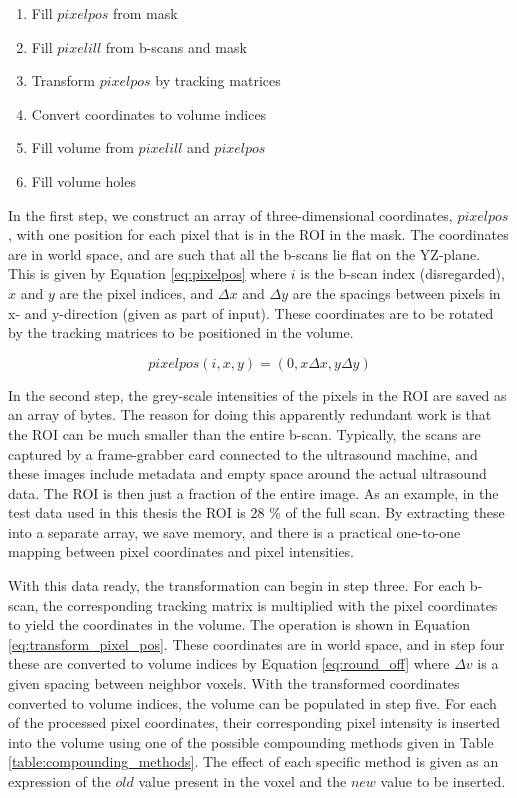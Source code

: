 	\begin{enumerate}
		\item Fill $pixelpos$ from mask
		\item Fill $pixelill$ from b-scans and mask
		\item Transform $pixelpos$ by tracking matrices
		\item Convert coordinates to volume indices
		\item Fill volume from $pixelill$ and $pixelpos$
		\item Fill volume holes
	\end{enumerate}
	
	In the first step, we construct an array of three-dimensional coordinates, $pixelpos$, with one position for each pixel that is in the ROI in the mask. The coordinates are in world space, and are such that all the b-scans lie flat on the YZ-plane. This is given by Equation \ref{eq:pixelpos} where $i$ is the b-scan index (disregarded), $x$ and $y$ are the pixel indices, and $\Delta x$ and $\Delta y$ are the spacings between pixels in x- and y-direction (given as part of input). These coordinates are to be rotated by the tracking matrices to be positioned in the volume.
	
	\begin{equation}
	\label{eq:pixelpos}
		pixelpos(i,x,y) = (0, x\Delta x, y\Delta y)
	\end{equation}
	
	In the second step, the grey-scale intensities of the pixels in the ROI are saved as an array of bytes. The reason for doing this apparently redundant work is that the ROI can be much smaller than the entire b-scan. Typically, the scans are captured by a frame-grabber card connected to the ultrasound machine, and these images include metadata and empty space around the actual ultrasound data. The ROI is then just a fraction of the entire image. As an example, in the test data used in this thesis the ROI is 28 \% of the full scan. By extracting these into a separate array, we save memory, and there is a practical one-to-one mapping between pixel coordinates and pixel intensities.
	
	With this data ready, the transformation can begin in step three. For each b-scan, the corresponding tracking matrix is multiplied with the pixel coordinates to yield the coordinates in the volume. The operation is shown in Equation \ref{eq:transform_pixel_pos}. These coordinates are in world space, and in step four these are converted to volume indices by Equation \ref{eq:round_off} where $\Delta v$ is a given spacing between neighbor voxels. With the transformed coordinates converted to volume indices, the volume can be populated in step five. For each of the processed pixel coordinates, their corresponding pixel intensity is inserted into the volume using one of the possible compounding methods given in Table \ref{table:compounding_methods}. The effect of each specific method is given as an expression of the $old$ value present in the voxel and the $new$ value to be inserted.
	
